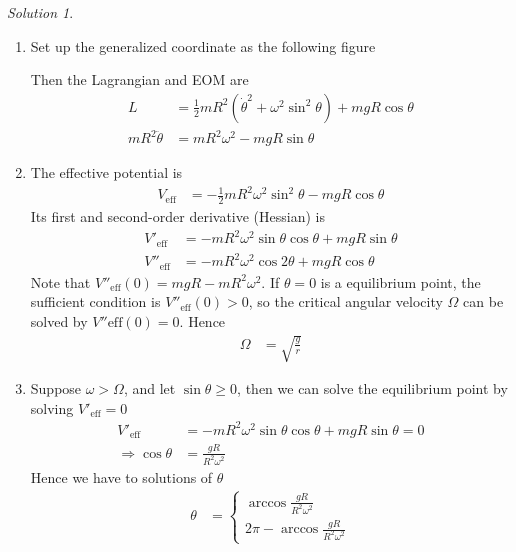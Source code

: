 \documentclass[twoside,11pt]{article}
\theoremstyle{definition}
\theoremstyle{remark}
\newtheorem*{solution}{Solution}
\begin{document}
\begin{solution}~
\begin{enumerate}[label=\arabic*)]
\item Set up the generalized coordinate as the following figure
\begin{figure}[H]
    \centering
    \def\r{1}
\end{figure}
Then the Lagrangian and EOM are
\begin{align*}
    L &= \frac{1}{2} mR^2(\dot\theta^2 + \omega^2\sin^2\theta) + mgR\cos\theta\\
    mR^2\ddot\theta &= mR^2\omega^2 - mgR\sin\theta
\end{align*}

\item The effective potential is
\begin{align*}
    V_\text{eff} &= -\frac{1}{2}mR^2\omega^2\sin^2\theta - mgR\cos\theta
\end{align*}
Its first and second-order derivative (Hessian) is
\begin{align*}
    V'_\text{eff}  &= -mR^2\omega^2\sin\theta\cos\theta + mgR\sin\theta\\
    V''_\text{eff} &= -mR^2\omega^2\cos2\theta + mgR\cos\theta
\end{align*}
Note that $V''_\text{eff}(0) = mgR - mR^2\omega^2$.
If $\theta=0$ is a equilibrium point, the sufficient condition is
$V''_\text{eff}(0) > 0$, so the critical angular velocity $\Omega$
can be solved by $V''\text{eff}(0) = 0$.
Hence
\begin{align*}
    \Omega &= \sqrt{\frac{g}{r}}
\end{align*}

\item Suppose $\omega>\Omega$, and let $\sin\theta\geq 0$, then
we can solve the equilibrium point by solving $V'_\text{eff}=0$
\begin{align*}
    V'_\text{eff} &= 
    -mR^2\omega^2\sin\theta\cos\theta + mgR\sin\theta = 0\\
    \Rightarrow 
    \cos\theta &= \frac{gR}{R^2\omega^2}
\end{align*}
Hence we have to solutions of $\theta$
\begin{align*}
    \theta &= \begin{cases}
        \arccos\frac{gR}{R^2\omega^2} \\
        2\pi - \arccos\frac{gR}{R^2\omega^2}
    \end{cases}
\end{align*}


\end{enumerate}
\end{solution}


\end{document}

